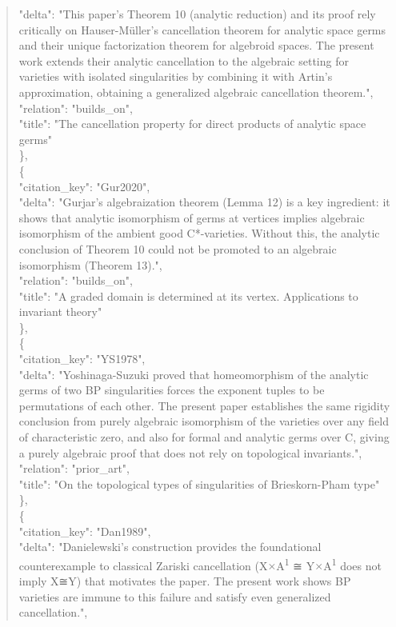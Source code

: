 \documentclass[11pt]{article}
\begin{document}
\begin{quote}
      "delta": "This paper's Theorem 10 (analytic reduction) and its proof rely critically on Hauser-Müller's cancellation theorem for analytic space germs and their unique factorization theorem for algebroid spaces. The present work extends their analytic cancellation to the algebraic setting for varieties with isolated singularities by combining it with Artin's approximation, obtaining a generalized algebraic cancellation theorem.",\\
      "relation": "builds\_on",\\
      "title": "The cancellation property for direct products of analytic space germs"\\
    \},\\
    \{\\
      "citation\_key": "Gur2020",\\
      "delta": "Gurjar's algebraization theorem (Lemma 12) is a key ingredient: it shows that analytic isomorphism of germs at vertices implies algebraic isomorphism of the ambient good C*-varieties. Without this, the analytic conclusion of Theorem 10 could not be promoted to an algebraic isomorphism (Theorem 13).",\\
      "relation": "builds\_on",\\
      "title": "A graded domain is determined at its vertex. Applications to invariant theory"\\
    \},\\
    \{\\
      "citation\_key": "YS1978",\\
      "delta": "Yoshinaga-Suzuki proved that homeomorphism of the analytic germs of two BP singularities forces the exponent tuples to be permutations of each other. The present paper establishes the same rigidity conclusion from purely algebraic isomorphism of the varieties over any field of characteristic zero, and also for formal and analytic germs over C, giving a purely algebraic proof that does not rely on topological invariants.",\\
      "relation": "prior\_art",\\
      "title": "On the topological types of singularities of Brieskorn-Pham type"\\
    \},\\
    \{\\
      "citation\_key": "Dan1989",\\
      "delta": "Danielewski's construction provides the foundational counterexample to classical Zariski cancellation (X\ensuremath{\times}A\textsuperscript{1} ≅ Y\ensuremath{\times}A\textsuperscript{1} does not imply X≅Y) that motivates the paper. The present work shows BP varieties are immune to this failure and satisfy even generalized cancellation.",\\

\end{quote}
\end{document}
